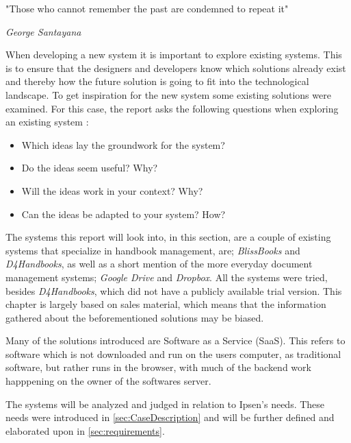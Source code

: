 \epigraph{"Those who cannot remember the past are condemned to repeat it"}{\textit{George Santayana}}
When developing a new system it is important to explore existing systems.
This is to ensure that the designers and developers know which solutions already exist and thereby how the future solution is going to fit into the technological landscape.
To get inspiration for the new system some existing solutions were examined.
For this case, the report asks the following questions when exploring an existing system \citep[p.~33]{Rod-Aalborg}:

\begin{itemize}
  \item Which ideas lay the groundwork for the system?
  \item Do the ideas seem useful? Why?
  \item Will the ideas work in your context? Why?
  \item Can the ideas be adapted to your system? How?
\end{itemize}

The systems this report will look into, in this section, are a couple of existing systems that specialize in handbook management, are; \textit{BlissBooks} and \textit{D4Handbooks}, as well as a short mention of the more everyday document management systems; \textit{Google Drive} and \textit{Dropbox}.
All the systems were tried, besides \textit{D4Handbooks}, which did not have a publicly available trial version. 
This chapter is largely based on sales material, which means that the information gathered about the beforementioned solutions may be biased.

Many of the solutions introduced are Software as a Service (SaaS).
This refers to software which is not downloaded and run on the users computer, as traditional software, but rather runs in the browser, with much of the backend work happpening on the owner of the softwares server. %

The systems will be analyzed and judged in relation to Ipsen's needs.
These needs were introduced in \ref{sec:CaseDescription} and will be further defined and elaborated upon in \ref{sec:requirements}.
